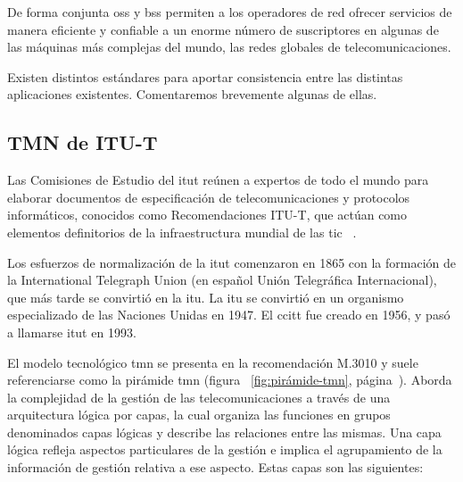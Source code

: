 De forma conjunta \acrshort{oss} y \acrshort{bss} permiten a los operadores de red ofrecer servicios de manera eficiente y confiable a un enorme número de suscriptores en algunas de las máquinas más complejas del mundo, las redes globales de telecomunicaciones.

Existen distintos estándares para aportar consistencia entre las distintas aplicaciones existentes. Comentaremos brevemente algunas de ellas.

\subsection{TMN de ITU-T}

Las Comisiones de Estudio del \acrfull{itut} reúnen a expertos de todo el mundo para elaborar documentos de especificación de telecomunicaciones y protocolos informáticos, conocidos como Recomendaciones ITU-T, que actúan como elementos definitorios de la infraestructura mundial de las \acrfull{tic}  ~\cite{ITU-T}. 

Los esfuerzos de normalización de la \acrshort{itut} comenzaron en 1865 con la formación de la International Telegraph Union (en español Unión Telegráfica Internacional), que más tarde se convirtió en la \acrfull{itu}. La \acrshort{itu} se convirtió en un organismo especializado de las Naciones Unidas en 1947. El \acrfull{ccitt} fue creado en 1956, y pasó a llamarse \acrshort{itut} en 1993.


El modelo tecnológico \acrshort{tmn} se presenta en la recomendación M.3010 y suele referenciarse como la pirámide \acrshort{tmn} (figura ~\ref{fig:pirámide-tmn}, página~\pageref{fig:pirámide-tmn}). Aborda la complejidad de la gestión de las telecomunicaciones a través de una arquitectura lógica por capas, la cual organiza las funciones en grupos denominados capas lógicas y describe las relaciones entre las mismas. Una capa lógica refleja aspectos particulares de la gestión e implica el agrupamiento de la información de gestión relativa a ese aspecto. Estas capas son las siguientes:

